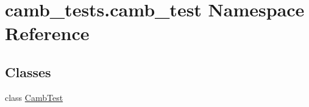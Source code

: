 \hypertarget{namespacecamb__tests_1_1camb__test}{}\section{camb\+\_\+tests.\+camb\+\_\+test Namespace Reference}
\label{namespacecamb__tests_1_1camb__test}
\subsection*{Classes}
\begin{DoxyCompactItemize}
\item 
class \mbox{\hyperlink{classcamb__tests_1_1camb__test_1_1CambTest}{Camb\+Test}}
\end{DoxyCompactItemize}
